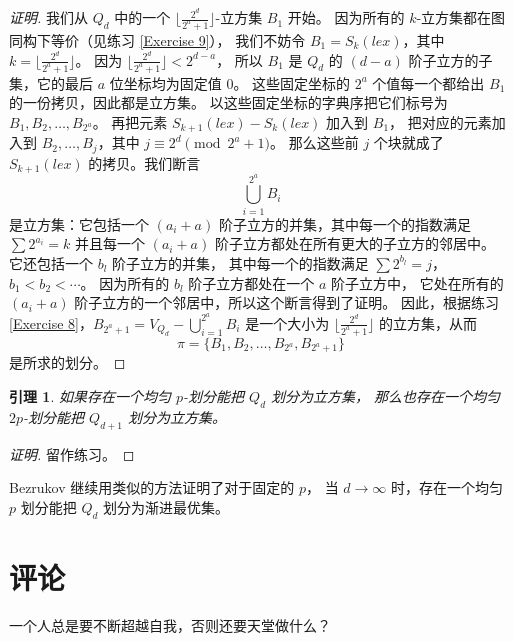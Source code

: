 \documentclass[12pt, a4paper]{article}
\newtheorem{lemma}{引理}
\begin{document}
\begin{proof}[证明]
我们从 $Q_d$ 中的一个 $\lfloor\frac{2^d}{2^a + 1}\rfloor$-立方集 $B_1$ 开始。
因为所有的 $k$-立方集都在图同构下等价（见练习 \ref{Exercise 9}），
我们不妨令 $B_1 = S_k(lex)$，其中 $k = \lfloor\frac{2^d}{2^a + 1}\rfloor$。
因为 $\lfloor\frac{2^d}{2^a + 1}\rfloor < 2^{d - a}$，
所以 $B_1$ 是 $Q_d$ 的 $(d - a)$ 阶子立方的子集，它的最后 $a$ 位坐标均为固定值 $0$。
这些固定坐标的 $2^a$ 个值每一个都给出 $B_1$ 的一份拷贝，因此都是立方集。
以这些固定坐标的字典序把它们标号为 $B_1, B_2, \dots, B_{2^a}$。
再把元素 $S_{k + 1}(lex) - S_k(lex)$ 加入到 $B_1$，
把对应的元素加入到 $B_2, \dots, B_j$，其中 $j \equiv 2^d \pmod{2^a + 1}$。
那么这些前 $j$ 个块就成了 $S_{k + 1}(lex)$ 的拷贝。我们断言
\begin{equation*}
\bigcup_{i = 1}^{2^a} B_i
\end{equation*}
是立方集：它包括一个 $(a_i + a)$ 阶子立方的并集，其中每一个的指数满足 $\sum 2^{a_i} = k$
并且每一个 $(a_i + a)$ 阶子立方都处在所有更大的子立方的邻居中。
它还包括一个 $b_l$ 阶子立方的并集，
其中每一个的指数满足 $\sum 2^{b_l} = j$，$b_1 < b_2 < \cdots$。
因为所有的 $b_l$ 阶子立方都处在一个 $a$ 阶子立方中，
它处在所有的 $(a_i + a)$ 阶子立方的一个邻居中，所以这个断言得到了证明。
因此，根据练习 \ref{Exercise 8}，$B_{2^a + 1} = V_{Q_d} - \bigcup_{i = 1}^{2^a} B_i$
是一个大小为 $\lfloor\frac{2^d}{2^a + 1}\rfloor$ 的立方集，从而
\begin{equation*}
\pi = \{B_1, B_2, \dots, B_{2^a}, B_{2^a + 1}\}
\end{equation*}
是所求的划分。
\end{proof}

\begin{lemma}
\label{Lemma 6}
如果存在一个均匀 $p$-划分能把 $Q_d$ 划分为立方集，
那么也存在一个均匀 $2 p$-划分能把 $Q_{d + 1}$ 划分为立方集。
\end{lemma}

\begin{proof}[证明]
留作练习。
\end{proof}

Bezrukov \cite{Bezrukov.1997} 继续用类似的方法证明了对于固定的 $p$，
当 $d \rightarrow \infty$ 时，存在一个均匀 $p$ 划分能把 $Q_d$ 划分为渐进最优集。

\section{评论}
\label{Section 4}

\begin{displayquote}
一个人总是要不断超越自我，否则还要天堂做什么？
\end{displayquote}
\end{document}
